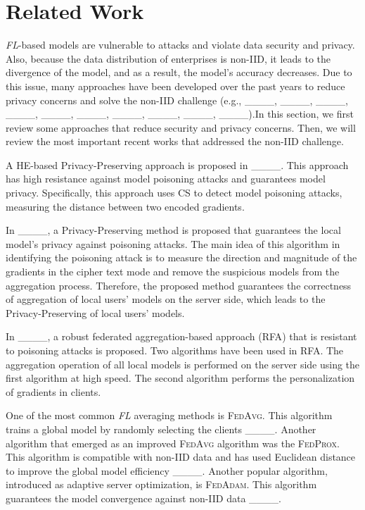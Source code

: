 \section{Related Work}
\label{RW1}
\emph{FL}-based models are vulnerable to attacks and violate data security and privacy. Also, because the data distribution of enterprises is non-IID, it leads to the divergence of the model, and as a result, the model's accuracy decreases. Due to this issue, many approaches have been developed over the past years to reduce privacy concerns and solve the non-IID challenge (e.g., ____, ____, ____, ____, ____, ____, ____, ____, ____, ____).In this section, we first review some approaches that reduce security and privacy concerns. Then, we will review the most important recent works that addressed the non-IID challenge.

A HE-based Privacy-Preserving approach is proposed in ____. This approach has high resistance against model poisoning attacks and guarantees model privacy. Specifically, this approach uses CS to detect model poisoning attacks, measuring the distance between two encoded gradients. 

In ____, a Privacy-Preserving method is proposed that guarantees the local model's privacy against poisoning attacks. The main idea of this algorithm in identifying the poisoning attack is to measure the direction and magnitude of the gradients in the cipher text mode and remove the suspicious models from the aggregation process. Therefore, the proposed method guarantees the correctness of aggregation of local users' models on the server side, which leads to the Privacy-Preserving of local users' models. 

In ____, a robust federated aggregation-based approach ({\textsc{RFA}}) that is resistant to poisoning attacks is proposed. Two algorithms have been used in {\textsc{RFA}}. The aggregation operation of all local models is performed on the server side using the first algorithm at high speed. The second algorithm performs the personalization of gradients in clients.

One of the most common \emph{FL} averaging methods is {\textsc{FedAvg}}. This algorithm trains a global model by randomly selecting the clients ____. Another algorithm that emerged as an improved {\textsc{FedAvg}} algorithm was the {\textsc{FedProx}}. This algorithm is compatible with non-IID data and has used Euclidean distance to improve the global model efficiency ____. Another popular algorithm, introduced as adaptive server optimization, is {\textsc{FedAdam}}. This algorithm guarantees the model convergence against non-IID data ____.


